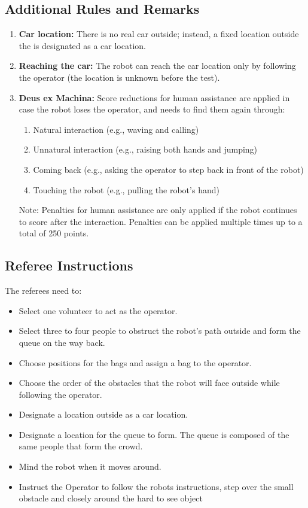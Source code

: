 \subsection*{Additional Rules and Remarks}
\begin{enumerate}[nosep]

	\item \textbf{Car location:} There is no real car outside; instead, a fixed location outside the \Arena{} is designated as a car location.

	\item \textbf{Reaching the car:} The robot can reach the car location only by following the operator (the location is unknown before the test).

	\item \textbf{Deus ex Machina:} Score reductions for human assistance are applied in case the robot loses the operator, and needs to find them again through:
    \begin{enumerate}
     \item Natural interaction (e.g., waving and calling)
     \item Unnatural interaction (e.g., raising both hands and jumping)
	 \item Coming back (e.g., asking the operator to step back in front of the robot)
     \item Touching the robot (e.g., pulling the robot's hand)
    \end{enumerate}
	Note: Penalties for human assistance are only applied if the robot continues to score after the interaction. Penalties can be applied multiple times up to a total of 250 points.
\end{enumerate}


\subsection*{Referee Instructions}

The referees need to:
\begin{itemize}[nosep]
	\item Select one volunteer to act as the operator.
	\item Select three to four people to obstruct the robot's path outside and form the queue on the way back.
	\item Choose positions for the bags and assign a bag to the operator.
	\item Choose the order of the obstacles that the robot will face outside while following the operator.
	\item Designate a location outside as a car location.
	\item Designate a location for the queue to form. The queue is composed of the same people that form the crowd.
	\item Mind the robot when it moves around.
	\item Instruct the Operator to follow the robots instructions, step over the small obstacle and closely around the hard to see object
\end{itemize}

